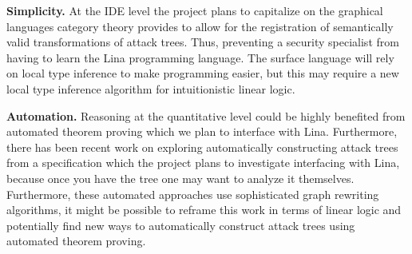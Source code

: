 \documentclass{sigplanconf}
\begin{document}
\textbf{Simplicity.}  At the IDE level the project plans to capitalize
on the graphical languages category theory provides
\cite{Selinger:2009} to allow for the registration of semantically
valid transformations of attack trees.  Thus, preventing a security
specialist from having to learn the Lina programming language.  The
surface language will rely on local type inference to make programming
easier, but this may require a new local type inference algorithm for
intuitionistic linear logic.

\textbf{Automation.}  Reasoning at the quantitative level could be
highly benefited from automated theorem proving which we plan to
interface with Lina.  Furthermore, there has been recent work
\cite{essay69399,Sheyner:2002:AGA:829514.830526,6957121,essay69402} on
exploring automatically constructing attack trees from a specification
which the project plans to investigate interfacing with Lina, because
once you have the tree one may want to analyze it themselves.
Furthermore, these automated approaches use sophisticated graph
rewriting algorithms, it might be possible to reframe this work in
terms of linear logic and potentially find new ways to automatically
construct attack trees using automated theorem proving.

\end{document}
